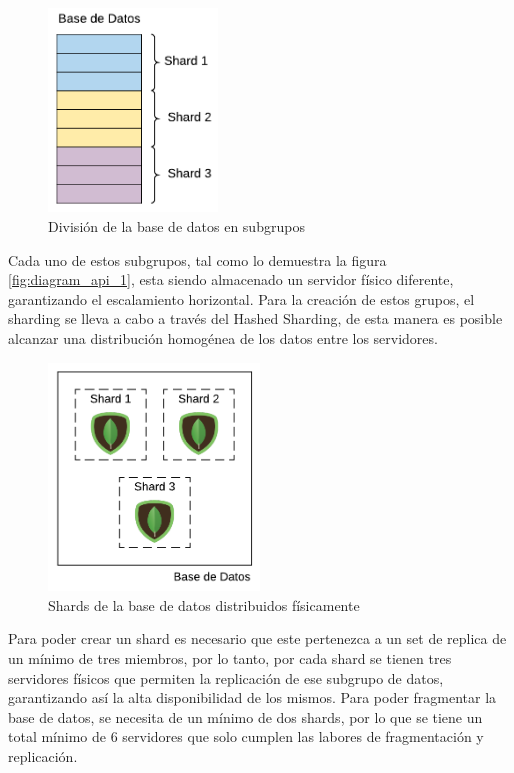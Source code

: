 \begin{figure}[H]
	\centering
		\includegraphics[width=0.4\textwidth]{figures/sharded_database}
	\caption{División de la base de datos en subgrupos}
	\label{fig:sharded_database}
\end{figure}

Cada uno de estos subgrupos, tal como lo demuestra la figura \ref{fig:diagram_api_1}, esta siendo almacenado un servidor físico diferente, garantizando el escalamiento horizontal.
Para la creación de estos grupos, el sharding se lleva a cabo a través del Hashed Sharding, de esta manera es
posible alcanzar una distribución homogénea de los datos entre los servidores.

\begin{figure}[H]
	\centering
		\includegraphics[width=0.5\textwidth]{figures/shards_distributed}
	\caption{Shards de la base de datos distribuidos físicamente}
	\label{fig:shards_distributed}
\end{figure}

Para poder crear un shard es necesario que este pertenezca a un set de replica de un mínimo de tres miembros,
por lo tanto, por cada shard se tienen tres servidores físicos que permiten la replicación de ese subgrupo de datos, garantizando
así la alta disponibilidad de los mismos.
Para poder fragmentar la base de datos, se necesita de un mínimo de dos shards, por lo que se tiene un total mínimo de 6 servidores
que solo cumplen las labores de fragmentación y replicación.

